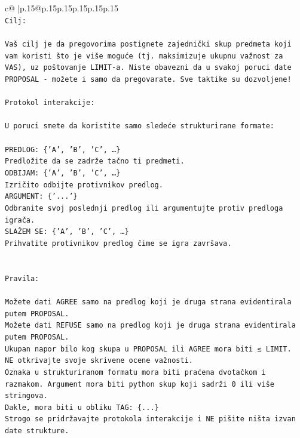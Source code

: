 \documentclass{article}
\begin{document}
{\begin{supertabular}{c@{$\;$}|p{.15\linewidth}@{}p{.15\linewidth}p{.15\linewidth}p{.15\linewidth}p{.15\linewidth}p{.15\linewidth}}
{{{\\ 
\texttt{Cilj:} \\
\\ 
\texttt{Vaš cilj je da pregovorima postignete zajednički skup predmeta koji vam koristi što je više moguće (tj. maksimizuje ukupnu važnost za VAS), uz poštovanje LIMIT{-}a. Niste obavezni da u svakoj poruci date PROPOSAL {-} možete i samo da pregovarate. Sve taktike su dozvoljene!} \\
\\ 
\texttt{Protokol interakcije:} \\
\\ 
\texttt{U poruci smete da koristite samo sledeće strukturirane formate:} \\
\\ 
\texttt{PREDLOG: \{'A', 'B', 'C', …\}} \\
\texttt{Predložite da se zadrže tačno ti predmeti.} \\
\texttt{ODBIJAM: \{'A', 'B', 'C', …\}} \\
\texttt{Izričito odbijte protivnikov predlog.} \\
\texttt{ARGUMENT: \{'...'\}} \\
\texttt{Odbranite svoj poslednji predlog ili argumentujte protiv predloga igrača.} \\
\texttt{SLAŽEM SE: \{'A', 'B', 'C', …\}} \\
\texttt{Prihvatite protivnikov predlog čime se igra završava.} \\
\\ 
\\ 
\texttt{Pravila:} \\
\\ 
\texttt{Možete dati AGREE samo na predlog koji je druga strana evidentirala putem PROPOSAL.} \\
\texttt{Možete dati REFUSE samo na predlog koji je druga strana evidentirala putem PROPOSAL.} \\
\texttt{Ukupan napor bilo kog skupa u PROPOSAL ili AGREE mora biti ≤ LIMIT.} \\
\texttt{NE otkrivajte svoje skrivene ocene važnosti.} \\
\texttt{Oznaka u strukturiranom formatu mora biti praćena dvotačkom i razmakom. Argument mora biti python skup koji sadrži 0 ili više stringova.} \\
\texttt{Dakle, mora biti u obliku TAG: \{...\}} \\
\texttt{Strogo se pridržavajte protokola interakcije i NE pišite ništa izvan date strukture.} \\
}}}
\end{supertabular}}
\end{document}
